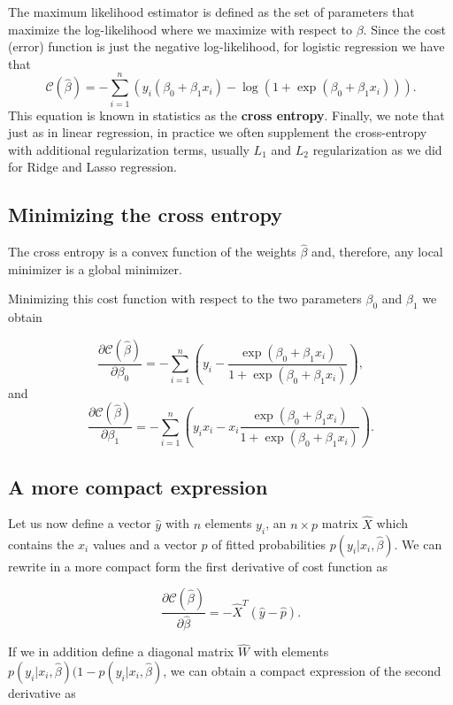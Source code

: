 \documentclass[%
oneside,                 %
final,                   %
10pt]{article}
\begin{document}
The maximum likelihood estimator is defined as the set of parameters that maximize the log-likelihood where we maximize with respect to $\beta$.
Since the cost (error) function is just the negative log-likelihood, for logistic regression we have that
\[
\mathcal{C}(\hat{\beta})=-\sum_{i=1}^n  \left(y_i(\beta_0+\beta_1x_i) -\log{(1+\exp{(\beta_0+\beta_1x_i)})}\right).
\]
This equation is known in statistics as the \textbf{cross entropy}. Finally, we note that just as in linear regression, 
in practice we often supplement the cross-entropy with additional regularization terms, usually $L_1$ and $L_2$ regularization as we did for Ridge and Lasso regression.

\subsection*{Minimizing the cross entropy}

The cross entropy is a convex function of the weights $\hat{\beta}$ and,
therefore, any local minimizer is a global minimizer. 


Minimizing this
cost function with respect to the two parameters $\beta_0$ and $\beta_1$ we obtain

\[
\frac{\partial \mathcal{C}(\hat{\beta})}{\partial \beta_0} = -\sum_{i=1}^n  \left(y_i -\frac{\exp{(\beta_0+\beta_1x_i)}}{1+\exp{(\beta_0+\beta_1x_i)}}\right),
\]
and 
\[
\frac{\partial \mathcal{C}(\hat{\beta})}{\partial \beta_1} = -\sum_{i=1}^n  \left(y_ix_i -x_i\frac{\exp{(\beta_0+\beta_1x_i)}}{1+\exp{(\beta_0+\beta_1x_i)}}\right).
\]

\subsection*{A more compact expression}

Let us now define a vector $\hat{y}$ with $n$ elements $y_i$, an
$n\times p$ matrix $\hat{X}$ which contains the $x_i$ values and a
vector $\hat{p}$ of fitted probabilities $p(y_i\vert x_i,\hat{\beta})$. We can rewrite in a more compact form the first
derivative of cost function as

\[
\frac{\partial \mathcal{C}(\hat{\beta})}{\partial \hat{\beta}} = -\hat{X}^T\left(\hat{y}-\hat{p}\right). 
\]

If we in addition define a diagonal matrix $\hat{W}$ with elements 
$p(y_i\vert x_i,\hat{\beta})(1-p(y_i\vert x_i,\hat{\beta})$, we can obtain a compact expression of the second derivative as 
\end{document}
